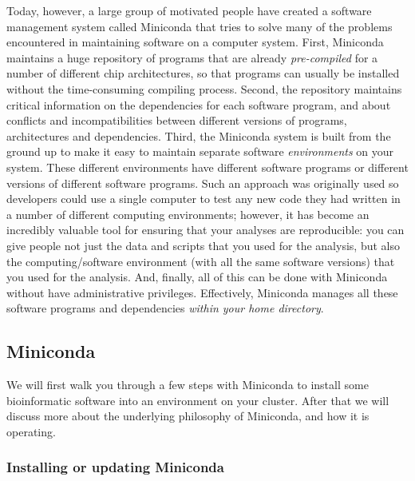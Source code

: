 \documentclass[]{krantz}
\begin{document}
Today, however, a large group of motivated people have created a software management
system called Miniconda that tries to solve many of the problems encountered in maintaining
software on a computer system. First, Miniconda maintains a huge repository of
programs that are already \emph{pre-compiled} for a number of different chip architectures, so that
programs can usually be installed without the time-consuming compiling process. Second, the repository
maintains critical information on the dependencies for each software program, and about
conflicts and incompatibilities between different versions of programs, architectures and
dependencies. Third, the Miniconda system is built from the ground up to make it easy to maintain
separate software \emph{environments} on your system. These different environments have different
software programs or different versions of different software programs. Such an approach
was originally used so developers could use a single computer to test any new code
they had written in a number of different
computing environments; however, it has become an incredibly valuable tool for ensuring
that your analyses are reproducible: you can give people not just the data and scripts that you
used for the analysis, but also the computing/software environment (with all the same
software versions) that you used for the analysis. And, finally, all of this
can be done with Miniconda without have administrative privileges. Effectively,
Miniconda manages all these software programs and dependencies \emph{within your home directory}.

\hypertarget{miniconda}{%
\subsection{Miniconda}\label{miniconda}}

We will first walk you through a few steps with Miniconda to install some
bioinformatic software into an environment on your cluster. After that we will discuss more about
the underlying philosophy of Miniconda, and how it is operating.

\hypertarget{installing-or-updating-miniconda}{%
\subsubsection{Installing or updating Miniconda}\label{installing-or-updating-miniconda}}
\end{document}
